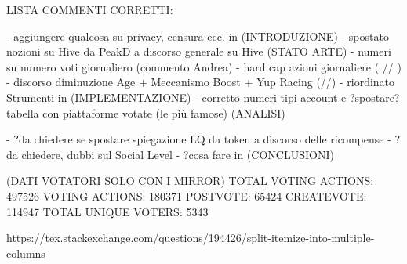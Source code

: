 LISTA COMMENTI CORRETTI:

- aggiungere qualcosa su privacy, censura ecc. in (INTRODUZIONE)
- spostato nozioni su Hive da PeakD a discorso generale su Hive (STATO ARTE)
- numeri su numero voti giornaliero (commento Andrea)
- hard cap azioni giornaliere ( // )
- discorso diminuzione Age + Meccanismo Boost + Yup Racing (//)
- riordinato Strumenti in (IMPLEMENTAZIONE)
- corretto numeri tipi account e ?spostare? tabella con piattaforme votate (le più famose) (ANALISI)


- ?da chiedere se spostare spiegazione LQ da token a discorso delle ricompense
- ?da chiedere, dubbi sul Social Level
- ?cosa fare in (CONCLUSIONI)



(DATI VOTATORI SOLO CON I MIRROR)
TOTAL VOTING ACTIONS:  497526
VOTING ACTIONS:  180371
POSTVOTE:  65424
CREATEVOTE:  114947
TOTAL UNIQUE VOTERS:  5343

https://tex.stackexchange.com/questions/194426/split-itemize-into-multiple-columns